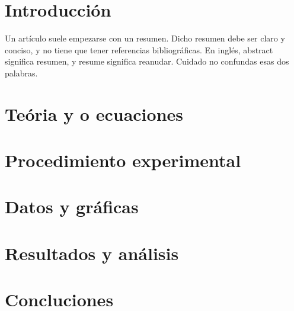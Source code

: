 \documentclass[10pt,a4paper]{article}
\begin{document}
\begin{multicols}{2}

\section{Introducción}  	
\label{sec1} %


Un artículo suele empezarse con un resumen. Dicho resumen debe ser claro y conciso, y no tiene que tener referencias bibliográficas. En inglés, abstract significa resumen, y resume significa reanudar. Cuidado no confundas esas dos palabras.

\section{Teória y o ecuaciones}
%
\label{sec2} 

\section{Procedimiento experimental}
%
\label{sec3} 

\section{Datos y gráficas}
%
\label{sec4} 

\section{Resultados y análisis}
%
\label{sec5} 

\section{Concluciones}
%
\label{sec6} 


\end{multicols}
\end{document}
